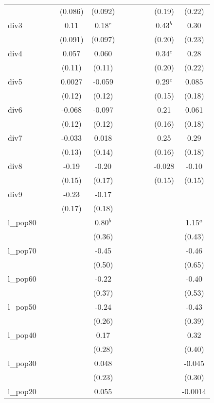 \documentclass[]{article}
\begin{document}
\begin{tabular}{lcccccccccc}
 &  &  & (0.086) & (0.092) &  &  &  &  & (0.19) & (0.22) \\
div3 &  &  & 0.11 & 0.18$^c$ &  &  &  &  & 0.43$^b$ & 0.30 \\
 &  &  & (0.091) & (0.097) &  &  &  &  & (0.20) & (0.23) \\
div4 &  &  & 0.057 & 0.060 &  &  &  &  & 0.34$^c$ & 0.28 \\
 &  &  & (0.11) & (0.11) &  &  &  &  & (0.20) & (0.22) \\
div5 &  &  & 0.0027 & -0.059 &  &  &  &  & 0.29$^c$ & 0.085 \\
 &  &  & (0.12) & (0.12) &  &  &  &  & (0.15) & (0.18) \\
div6 &  &  & -0.068 & -0.097 &  &  &  &  & 0.21 & 0.061 \\
 &  &  & (0.12) & (0.12) &  &  &  &  & (0.16) & (0.18) \\
div7 &  &  & -0.033 & 0.018 &  &  &  &  & 0.25 & 0.29 \\
 &  &  & (0.13) & (0.14) &  &  &  &  & (0.16) & (0.18) \\
div8 &  &  & -0.19 & -0.20 &  &  &  &  & -0.028 & -0.10 \\
 &  &  & (0.15) & (0.17) &  &  &  &  & (0.15) & (0.15) \\
div9 &  &  & -0.23 & -0.17 &  &  &  &  &  &  \\
 &  &  & (0.17) & (0.18) &  &  &  &  &  &  \\
l\_pop80 &  &  &  & 0.80$^b$ &  &  &  &  &  & 1.15$^a$ \\
 &  &  &  & (0.36) &  &  &  &  &  & (0.43) \\
l\_pop70 &  &  &  & -0.45 &  &  &  &  &  & -0.46 \\
 &  &  &  & (0.50) &  &  &  &  &  & (0.65) \\
l\_pop60 &  &  &  & -0.22 &  &  &  &  &  & -0.40 \\
 &  &  &  & (0.37) &  &  &  &  &  & (0.53) \\
l\_pop50 &  &  &  & -0.24 &  &  &  &  &  & -0.43 \\
 &  &  &  & (0.26) &  &  &  &  &  & (0.39) \\
l\_pop40 &  &  &  & 0.17 &  &  &  &  &  & 0.32 \\
 &  &  &  & (0.28) &  &  &  &  &  & (0.40) \\
l\_pop30 &  &  &  & 0.048 &  &  &  &  &  & -0.045 \\
 &  &  &  & (0.23) &  &  &  &  &  & (0.30) \\
l\_pop20 &  &  &  & 0.055 &  &  &  &  &  & -0.0014 \\

\end{tabular}
\end{document}

